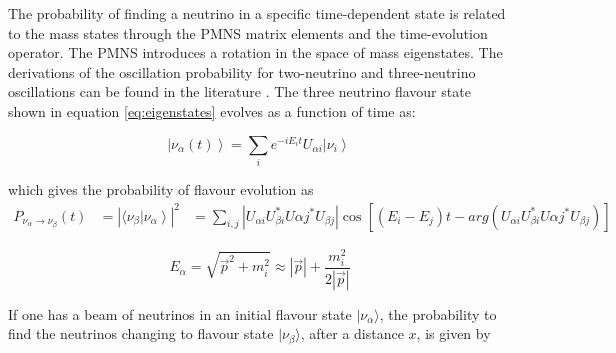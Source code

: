 The probability of finding a neutrino in a specific time-dependent state is related to the mass states through the PMNS matrix elements and the time-evolution operator. The PMNS introduces a rotation in the space of mass eigenstates. The derivations of the oscillation probability for two-neutrino and three-neutrino oscillations can be found in the literature \cite{34doi:10.1142/9789812562203_0002}. The three neutrino flavour state shown in equation \ref{eq:eigenstates} evolves as a function of time as:

\begin{equation}
\label{eq:eigenstatesTime}
 \left| \nu_\alpha (t) \right\rangle = \sum_{i} e^{-i E_i t} U_{\alpha i} \left| \nu_i \right\rangle\,
 \end{equation}

which gives the probability of flavour evolution as 
\begin{equation}
\begin{aligned}
P_{\nu_\alpha \rightarrow \nu_\beta} (t) &= \left|  \langle \nu_\beta \left| \nu_\alpha     \right\rangle  \right|^2
& = \sum_{i,j} \left| U_{\alpha i} U_{\beta i}^* U{\alpha j}^* U_{\beta j} \right| \cos[(E_i - E_j)t -arg(U_{\alpha i} U_{\beta i}^* U{\alpha j}^* U_{\beta j} ) ]
\end{aligned}
\end{equation}

\begin{equation}
\label{eq:Energy-momentum}
E_\alpha = \sqrt{\vec{p}^2 + m_i^2} \approx \left| \vec{p} \right| + \frac{m_i^2}{2\left| \vec{p} \right|}
\end{equation}

If one has a beam of neutrinos in an initial flavour state $|\nu_\alpha \rangle$, the probability to find the neutrinos changing to flavour state $|\nu_\beta \rangle$, after a distance $x$, is given by

